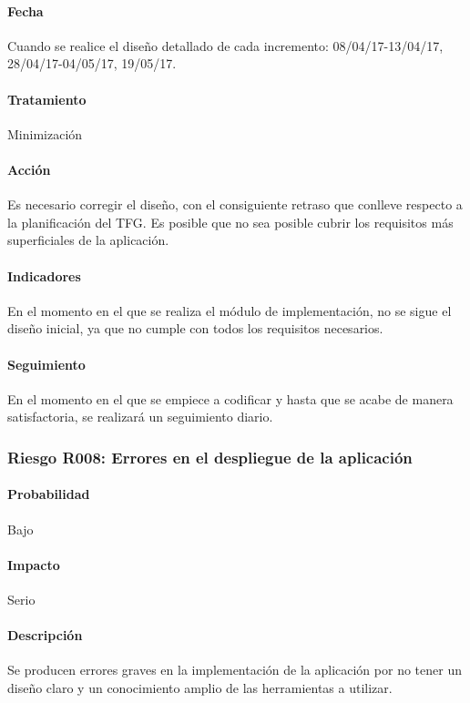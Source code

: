 \documentclass[10pt,a4paper]{article}
\begin{document}
				\paragraph{Fecha} Cuando se realice el diseño detallado de cada incremento: 08/04/17-13/04/17, 28/04/17-04/05/17, 19/05/17.%
				\paragraph{Tratamiento} Minimización  %
				\paragraph{Acción} Es necesario corregir el diseño, con el consiguiente retraso que conlleve respecto a la planificación del TFG. Es posible que no sea posible cubrir los requisitos más superficiales de la aplicación.%
				\paragraph{Indicadores} En el momento en el que se realiza el módulo de implementación, no se sigue el diseño inicial, ya que no cumple con todos los requisitos necesarios. %
				\paragraph{Seguimiento}	En el momento en el que se empiece a codificar y hasta que se acabe de manera satisfactoria, se realizará un seguimiento diario. %
			
			\subsubsection{Riesgo R008: Errores en el despliegue de la aplicación}
				\paragraph{Probabilidad} Bajo
				\paragraph{Impacto}	Serio
				\paragraph{Descripción} Se producen errores graves en la implementación de la aplicación por no tener un diseño claro y un conocimiento amplio de las herramientas a utilizar.
\end{document}
